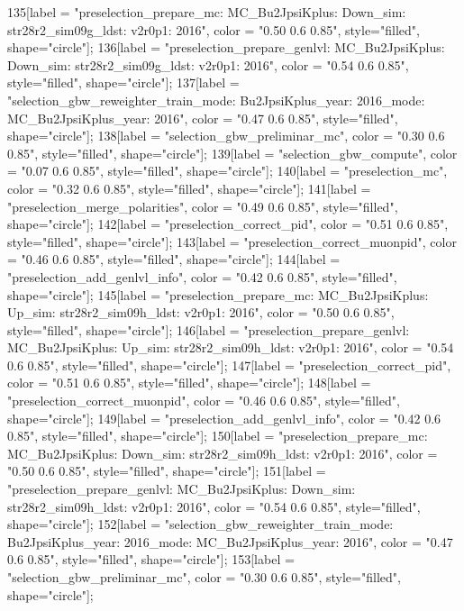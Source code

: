 {	135[label = "preselection_prepare_mc\nmode: MC_Bu2JpsiKplus\npolarity: Down\nstrip_sim: str28r2_sim09g_ldst\nversion: v2r0p1\nyear: 2016", color = "0.50 0.6 0.85", style="filled", shape="circle"];
	136[label = "preselection_prepare_genlvl\nmode: MC_Bu2JpsiKplus\npolarity: Down\nstrip_sim: str28r2_sim09g_ldst\nversion: v2r0p1\nyear: 2016", color = "0.54 0.6 0.85", style="filled", shape="circle"];
	137[label = "selection_gbw_reweighter_train\ndata_mode: Bu2JpsiKplus\ndata_year: 2016\nmc_mode: MC_Bu2JpsiKplus\nmc_year: 2016", color = "0.47 0.6 0.85", style="filled", shape="circle"];
	138[label = "selection_gbw_preliminar_mc", color = "0.30 0.6 0.85", style="filled", shape="circle"];
	139[label = "selection_gbw_compute", color = "0.07 0.6 0.85", style="filled", shape="circle"];
	140[label = "preselection_mc", color = "0.32 0.6 0.85", style="filled", shape="circle"];
	141[label = "preselection_merge_polarities", color = "0.49 0.6 0.85", style="filled", shape="circle"];
	142[label = "preselection_correct_pid", color = "0.51 0.6 0.85", style="filled", shape="circle"];
	143[label = "preselection_correct_muonpid", color = "0.46 0.6 0.85", style="filled", shape="circle"];
	144[label = "preselection_add_genlvl_info", color = "0.42 0.6 0.85", style="filled", shape="circle"];
	145[label = "preselection_prepare_mc\nmode: MC_Bu2JpsiKplus\npolarity: Up\nstrip_sim: str28r2_sim09h_ldst\nversion: v2r0p1\nyear: 2016", color = "0.50 0.6 0.85", style="filled", shape="circle"];
	146[label = "preselection_prepare_genlvl\nmode: MC_Bu2JpsiKplus\npolarity: Up\nstrip_sim: str28r2_sim09h_ldst\nversion: v2r0p1\nyear: 2016", color = "0.54 0.6 0.85", style="filled", shape="circle"];
	147[label = "preselection_correct_pid", color = "0.51 0.6 0.85", style="filled", shape="circle"];
	148[label = "preselection_correct_muonpid", color = "0.46 0.6 0.85", style="filled", shape="circle"];
	149[label = "preselection_add_genlvl_info", color = "0.42 0.6 0.85", style="filled", shape="circle"];
	150[label = "preselection_prepare_mc\nmode: MC_Bu2JpsiKplus\npolarity: Down\nstrip_sim: str28r2_sim09h_ldst\nversion: v2r0p1\nyear: 2016", color = "0.50 0.6 0.85", style="filled", shape="circle"];
	151[label = "preselection_prepare_genlvl\nmode: MC_Bu2JpsiKplus\npolarity: Down\nstrip_sim: str28r2_sim09h_ldst\nversion: v2r0p1\nyear: 2016", color = "0.54 0.6 0.85", style="filled", shape="circle"];
	152[label = "selection_gbw_reweighter_train\ndata_mode: Bu2JpsiKplus\ndata_year: 2016\nmc_mode: MC_Bu2JpsiKplus\nmc_year: 2016", color = "0.47 0.6 0.85", style="filled", shape="circle"];
	153[label = "selection_gbw_preliminar_mc", color = "0.30 0.6 0.85", style="filled", shape="circle"];
}
